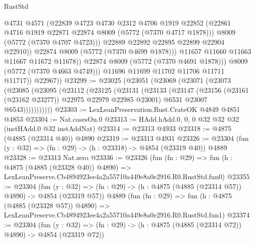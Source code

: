 \begin{lexlean}{RustStd}
\begin{coremodule}
                          @4731
                          @4571
                          (@22839
                            @4723
                            @4730
                            @2312
                            @4706
                            @1919
                            @22852
                            (@22861 @4716 @1919 @22871 @22874 @8009 (@5772 (@7370 @4717 @1878)))
                            @8009
                            (@5772 (@7370 @4707 @4723)))
                          @22889
                          @22892
                          @22895
                          @22899
                          @22904
                          @22910))
                      @22874
                      @8009
                      (@5772 (@7370 @4699 @1878)))
                    @11657
                    @11660
                    @11663
                    @11667
                    @11672
                    @11678))
                @22874
                @8009
                (@5772 (@7370 @4691 @1878)))
              @8009
              (@5772 (@7370 @4663 @4749)))
            @11696
            @11699
            @11702
            @11706
            @11711
            @11717))
        @22967))
@23299 := @23025
    (@23051
      (@23069
        (@23071
          (@23073
            (@23085
              (@23095
                (@23112
                  (@23125
                    (@23131
                      (@23133
                        (@23147
                          (@23156 (@23161 (@23162 @23277)) @22975 @22979 @22985 @23001)
                          @6531
                          @23007
                          @6543)))))))))))
@23303 := LexLeanPreservation.Rust.CrateOK @4849 @4851 @4853
@23304 := Nat.casesOn.{0}
@23313 := HAdd.hAdd.{0, 0, 0} @32 @32 @32 (instHAdd.{0} @32 instAddNat)
@23314 := @23313 @4933
@23318 := @4875 (@4885 (@23314 @40)) @4890
@23319 := @23313 @4931
@23326 := @23304 (fun (y : @32) => (fn : @29) -> (h : @23318) -> @4854 (@23319 @40)) @4889
@23328 := @23313 Nat.zero
@23336 := @23326
    (fun (fn : @29) =>
    fun (h : @4875 (@4885 (@23328 @40)) @4890) =>
    LexLeanPreserve.Cb4894923ee4a2a55710a449e8a0e2916.R0.RustStd.fun0)
@23355 := @23304
    (fun (y : @32) => (fn : @29) -> (h : @4875 (@4885 (@23314 @57)) @4890) -> @4854 (@23319 @57))
    @4889
    (fun (fn : @29) =>
    fun (h : @4875 (@4885 (@23328 @57)) @4890) =>
    LexLeanPreserve.Cb4894923ee4a2a55710a449e8a0e2916.R0.RustStd.fun1)
@23374 := @23304
    (fun (y : @32) => (fn : @29) -> (h : @4875 (@4885 (@23314 @72)) @4890) -> @4854 (@23319 @72))

\end{coremodule}
\end{lexlean}
